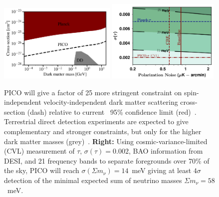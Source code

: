 \documentclass[PICOReport.tex]{subfiles}
\begin{document}
%
\begin{figure}[t]
\begin{center}
\includegraphics[width=0.50\textwidth]{images/pico_dd3.pdf}
\includegraphics[width=0.48\textwidth]{images/Mnu_tauprior_final.pdf}
\caption{ PICO will give a factor of 25 more stringent constraint on spin-independent velocity-independent dark matter scattering cross-section (dash) relative to current \planck\ 95\% confidence limit (red)~\citep{2018PhRvL.121h1301G}. Terrestrial direct detection experiments are expected to give complementary and stronger constraints, but only for the higher dark matter masses (grey)~\cite{2018PhRvD..97l3013K}. 
{\bf Right:} Using cosmic-variance-limited (CVL) measurement of $\tau,\, \sigma(\tau)=0.002$, \ac{BAO} information from DESI, and 21 frequency bands to separate foregrounds over 70\% of the sky, PICO will reach $\sigma(\Sigma m_{\nu}) = 14$~meV giving at least $4\sigma$ detection of the minimal expected sum of neutrino masses $\Sigma m_{\nu} = 58$~meV. 
\label{fig:DM_baryons} }
\end{center}
\vspace{-0.15in}
\end{figure}
%
\end{document}
